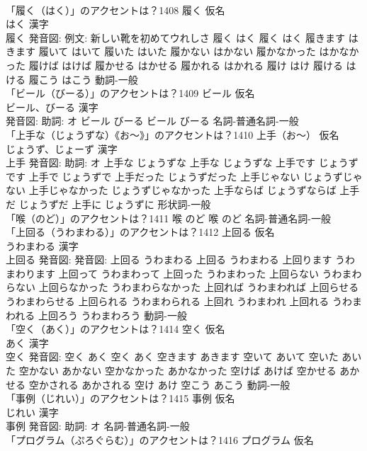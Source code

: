 \documentclass[8pt]{extreport}
\begin{document}
\begin{CJK}{UTF8}{min}
\\	「履く（はく）」のアクセントは？1408	履く 仮名　
\\	はく 漢字　
\\	履く 発音図: 例文: 新しい靴を初めてウれしさ	履く はく		履く はく 履きます はきます 履いて はいて 履いた はいた 履かない はかない 履かなかった はかなかった 履けば はけば 履かせる はかせる 履かれる はかれる 履け はけ 履ける はける 履こう はこう				動詞-一般 
\\	「ビール（びーる）」のアクセントは？1409	ビール 仮名　
\\	ビール、びーる 漢字　
\\	発音図: 助詞: オ	ビール びーる		ビール びーる				名詞-普通名詞-一般 
\\	「上手な（じょうずな）《お〜》」のアクセントは？1410	上手（お〜） 仮名　
\\	じょうず、じょーず 漢字　
\\	上手 発音図: 助詞: オ	上手な じょうずな		上手な じょうずな 上手です じょうずです 上手で じょうずで 上手だった じょうずだった 上手じゃない じょうずじゃない 上手じゃなかった じょうずじゃなかった 上手ならば じょうずならば 上手だ じょうずだ 上手に じょうずに				形状詞-一般 
\\	「喉（のど）」のアクセントは？1411		喉 のど		喉 のど				名詞-普通名詞-一般 
\\	「上回る（うわまわる）」のアクセントは？1412	上回る 仮名　
\\	うわまわる 漢字　
\\	上回る 発音図: 発音図:	上回る うわまわる		上回る うわまわる 上回ります うわまわります 上回って うわまわって 上回った うわまわった 上回らない うわまわらない 上回らなかった うわまわらなかった 上回れば うわまわれば 上回らせる うわまわらせる 上回られる うわまわられる 上回れ うわまわれ 上回れる うわまわれる 上回ろう うわまわろう				動詞-一般 
\\	「空く（あく）」のアクセントは？1414	空く 仮名　
\\	あく 漢字　
\\	空く 発音図:	空く あく		空く あく 空きます あきます 空いて あいて 空いた あいた 空かない あかない 空かなかった あかなかった 空けば あけば 空かせる あかせる 空かされる あかされる 空け あけ 空こう あこう				動詞-一般 
\\	「事例（じれい）」のアクセントは？1415	事例 仮名　
\\	じれい 漢字　
\\	事例 発音図: 助詞: オ							名詞-普通名詞-一般 
\\	「プログラム（ぷろぐらむ）」のアクセントは？1416	プログラム 仮名　

\end{CJK}
\end{document}
